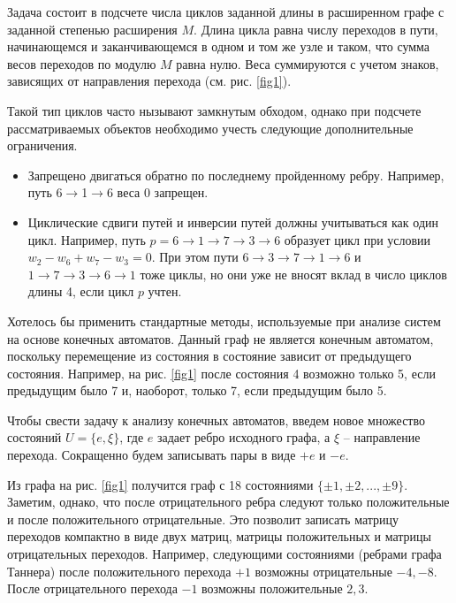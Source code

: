 \documentclass[specification,annotation,times]{itmo-student-thesis}
\begin{document}
Задача состоит в подсчете числа циклов заданной длины в расширенном 
графе с заданной степенью расширения $M$. Длина цикла равна числу переходов в 
пути, начинающемся и заканчивающемся  в одном и том же узле и таком, что 
сумма весов переходов по модулю $M$ равна нулю. 
Веса суммируются с учетом знаков, зависящих от направления 
перехода (см. рис. \ref{fig1}).

Такой тип циклов часто нызывают замкнутым обходом, однако при подсчете
рассматриваемых объектов необходимо учесть следующие дополнительные ограничения.
\begin{itemize}
\item
Запрещено двигаться обратно по последнему пройденному ребру. Например,
путь  6$\to$1$\to$6 веса 0 запрещен.
\item
Циклические сдвиги путей и инверсии путей должны  учитываться как один цикл. Например, путь
$p=6\to 1 \to 7\to 3 \to 6$  образует цикл при условии $w_2-w_6+w_7-w_3=0$. При этом пути
$6 \to 3 \to 7\to 1 \to 6$ и  $1\to 7 \to 3\to 6 \to 1$ тоже циклы, но они уже не вносят
вклад в число циклов длины 4,
если цикл $p$ учтен. 
\end{itemize}

Хотелось бы применить стандартные методы, используемые при анализе систем на основе 
конечных автоматов. Данный граф не является конечным автоматом, поскольку перемещение
из состояния в состояние зависит от предыдущего состояния.  Например, на рис. \ref{fig1}
после состояния 4 возможно только 5, если предыдущим было 7 и, наоборот,
только 7, если предыдущим было 5. 

Чтобы свести задачу к анализу конечных автоматов, введем новое множество состояний 
$U=\{e,\xi\}$, где  $e$ задает ребро исходного графа, а $\xi$ -- направление перехода. 
Сокращенно будем записывать пары в виде $+e$  и $-e$.   
 
Из графа на рис. \ref{fig1} получится  граф с 18 состояниями $\{ \pm 1, \pm 2,..., \pm 9\}$.
Заметим, однако, что после отрицательного  ребра следуют только положительные и после 
положительного отрицательные. Это позволит записать матрицу переходов компактно 
в виде двух матриц, матрицы положительных и матрицы отрицательных переходов.
Например, следующими состояниями (ребрами графа Таннера) после положительного перехода 
$+1$  возможны отрицательные $-4, -8$. После отрицательного перехода
$-1$  возможны положительные $2,3$. 
\end{document}
